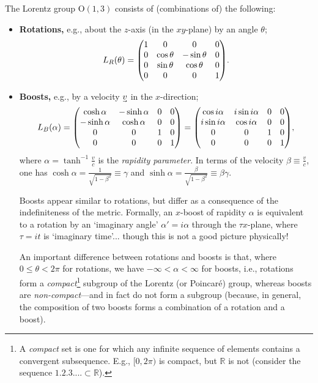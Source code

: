 The Lorentz group $\mathrm{O}(1,3)$ consists of (combinations of) the following:
\begin{itemize}
    \item \textbf{Rotations,} e.g., about the $z$-axis (in the $xy$-plane) by an angle $\theta$;
    \begin{align}
        L_R(\theta) = \mqty(
            1 & 0 & 0 & 0 \\
            0 & \cos\theta & -\sin\theta & 0 \\
            0 & \sin\theta & \cos\theta & 0 \\
            0 & 0 & 0 & 1 \\
        )
    .\end{align}
    
    \item \textbf{Boosts,} e.g., by a velocity $\uvec v$ in the $x$-direction;
    \begin{align}
        L_B(\alpha) = \mqty(
            \cosh\alpha & -\sinh\alpha & 0 & 0 \\
            -\sinh\alpha & \cosh\alpha & 0 & 0 \\
            0 & 0 & 1 & 0 \\
            0 & 0 & 0 & 1 \\
        ) = \mqty(
            \cos i\alpha & i\sin i\alpha & 0 & 0 \\
            i\sin i\alpha & \cos i\alpha & 0 & 0 \\
            0 & 0 & 1 & 0 \\
            0 & 0 & 0 & 1 \\
        )
    ,\end{align}
    where \begin{math}
        \alpha = \tanh^{-1}\frac{v}{c}
    \end{math}
    is the \textit{rapidity parameter}.
    In terms of the velocity $\beta \equiv \frac{v}{c}$, one has $\cosh\alpha = \frac1{\sqrt{1 - \beta^2}} \equiv \gamma$ and $\sinh\alpha = \frac{\beta}{\sqrt{1 - \beta^2}} \equiv \beta\gamma$.
    
    \begin{note}
    Boosts appear similar to rotations, but differ as a consequence of the indefiniteness of the metric.
    Formally, an $x$-boost of rapidity $\alpha$ is equivalent to a rotation by an `imaginary angle' $\alpha' = i\alpha$ through the $\tau x$-plane, where $\tau = it$ is `imaginary time'... though this is not a good picture physically!
    \end{note}
    
    An important difference between rotations and boosts is that, where $0 \le \theta < 2\pi$ for rotations, we have $-\infty < \alpha < \infty$ for boosts, i.e., rotations form a \textit{compact}\footnote{A \textit{compact} set is one for which any infinite sequence of elements contains a convergent subsequence. E.g., $[0, 2\pi)$ is compact, but $\mathbb{R}$ is not (consider the sequence $\qty{1, 2, 3, ...} \subset \mathbb{R}$).} subgroup of the Lorentz (or Poincaré) group, whereas boosts are \textit{non-compact}---and in fact do not form a subgroup (because, in general, the composition of two boosts forms a combination of a rotation and a boost).
\end{itemize}
